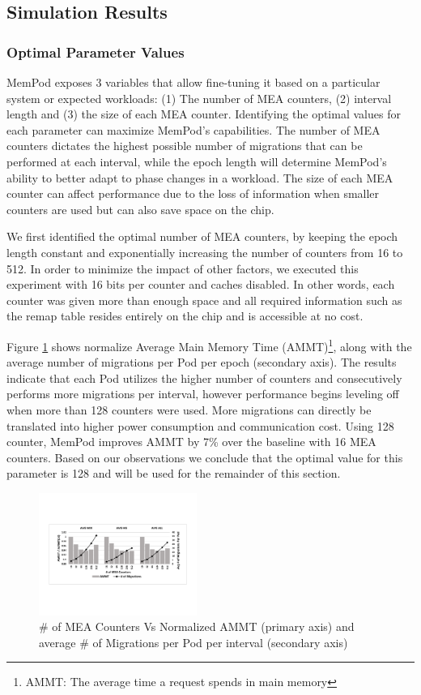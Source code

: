 \subsection{Simulation Results}
\label{sub:SimResults}

\subsubsection{Optimal Parameter Values}

MemPod exposes 3 variables that allow fine-tuning it based on a particular system or expected workloads: (1) The number of MEA counters, (2) interval length and (3) the size of each MEA counter. Identifying the optimal values for each parameter can maximize MemPod's capabilities. The number of MEA counters dictates the highest possible number of migrations that can be performed at each interval, while the epoch length will determine MemPod's ability to better adapt to phase changes in a workload. The size of each MEA counter can affect performance due to the loss of information when smaller counters are used but can also save space on the chip.

We first identified the optimal number of MEA counters, by keeping the epoch length constant and exponentially increasing the number of counters from 16 to 512. In order to minimize the impact of other factors, we executed this experiment with 16 bits per counter and caches disabled. In other words, each counter was given more than enough space and all required information such as the remap table resides entirely on the chip and is accessible at no cost. 

Figure \ref{fig:num_counters} shows normalize Average Main Memory Time (AMMT)\footnote{AMMT: The average time a request spends in main memory}, along with the average number of migrations per Pod per epoch (secondary axis). The results indicate that each Pod utilizes the higher number of counters and consecutively performs more migrations per interval, however performance begins leveling off when more than 128 counters were used. More migrations can directly be translated into higher power consumption and communication cost. Using 128 counter, MemPod improves AMMT by 7\% over the baseline with 16 MEA counters. Based on our observations we conclude that the optimal value for this parameter is 128 and will be used for the remainder of this section.

\begin{figure}[h]
	\centering
  \includegraphics[width=0.46\textwidth]{figures/avg_num_counters_normalized.pdf}
  \caption{\# of MEA Counters Vs Normalized AMMT (primary axis) and average \# of Migrations per Pod per interval (secondary axis)}
  \label{fig:num_counters}
\end{figure}

